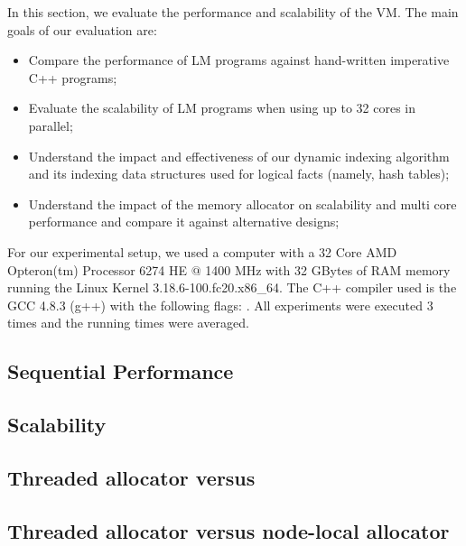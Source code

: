 In this section, we evaluate the performance and scalability of the VM. The main
goals of our evaluation are:

\begin{itemize}
   \item Compare the performance of LM programs against hand-written
      imperative C++ programs;
   \item Evaluate the scalability of LM programs when using up to 32 cores
      in parallel;
   \item Understand the impact and effectiveness of our dynamic indexing
      algorithm and its indexing data structures used for logical facts (namely,
      hash tables);
   \item Understand the impact of the memory allocator on scalability and
      multi core performance and compare it against alternative designs;
\end{itemize}

For our experimental setup, we used a computer with a 32 Core AMD
Opteron(tm) Processor 6274 HE $@$ 1400 MHz with 32 GBytes of RAM memory running
the Linux Kernel 3.18.6-100.fc20.x86\_64. The C++ compiler used is the GCC
4.8.3 (g++) with the following  flags: .  All experiments were executed 3 times and the running times
were averaged.

\subsection{Sequential Performance}\label{section:implementation:performance}


\subsection{Scalability}


\clearpage

\subsection{Threaded allocator versus }



\subsection{Threaded allocator versus node-local allocator}\label{section:implementation:alternative_allocator}

